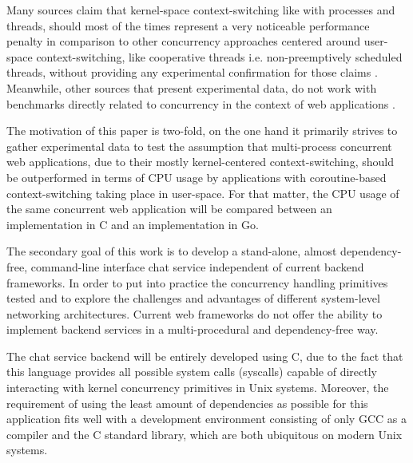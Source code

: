 Many sources claim that kernel-space context-switching like with processes and threads, should most of the times represent a very noticeable performance penalty in comparison to other concurrency approaches centered around user-space context-switching, like cooperative threads i.e. non-preemptively scheduled threads, without providing any experimental confirmation for those claims \cite{2003Events}\cite{2005Threads}\cite{Cox-Buday2017}\cite{Kerrisk2010}. Meanwhile, other sources that present experimental data, do not work with benchmarks directly related to concurrency in the context of web applications \cite{2013ContextSwitching}\cite{2008Pekka}. 

The motivation of this paper is two-fold, on the one hand it primarily strives to gather experimental data to test the assumption that multi-process concurrent web applications, due to their mostly kernel-centered context-switching, should be outperformed in terms of CPU usage by applications with coroutine-based context-switching taking place in user-space. For that matter, the CPU usage of the same concurrent web application will be compared between an implementation in C and an implementation in Go.

The secondary goal of this work is to develop a stand-alone, almost dependency-free, command-line interface chat service independent of current backend frameworks. In order to put into practice the concurrency handling primitives tested and to explore the challenges and advantages of different system-level networking architectures. Current web frameworks do not offer the ability to implement backend services in a multi-procedural and dependency-free way. 

The chat service backend will be entirely developed using C, due to the fact that this language provides all possible system calls (syscalls) capable of directly interacting with kernel concurrency primitives in Unix systems. Moreover, the requirement of using the least amount of dependencies as possible for this application fits well with a development environment consisting of only GCC as a compiler and the C standard library, which are both ubiquitous on modern Unix systems. 

